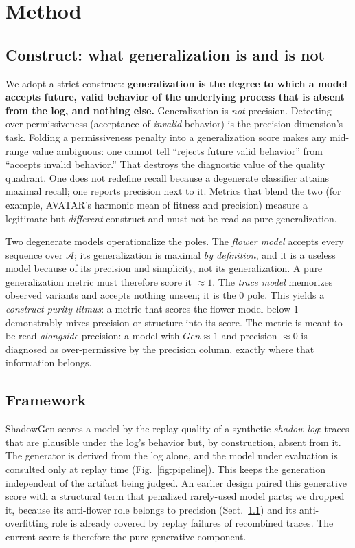 \documentclass[runningheads]{llncs}
\begin{document}
\section{Method}
\label{sec:method}

\subsection{Construct: what generalization is and is not}
\label{sec:method:construct}
We adopt a strict construct: \textbf{generalization is the degree to which a model accepts future, valid behavior of the underlying process that is absent from the log, and nothing else.} Generalization is \emph{not} precision. Detecting over-permissiveness (acceptance of \emph{invalid} behavior) is the precision dimension's task. Folding a permissiveness penalty into a generalization score makes any mid-range value ambiguous: one cannot tell ``rejects future valid behavior'' from ``accepts invalid behavior.'' That destroys the diagnostic value of the quality quadrant. One does not redefine recall because a degenerate classifier attains maximal recall; one reports precision next to it. Metrics that blend the two (for example, AVATAR's harmonic mean of fitness and precision) measure a legitimate but \emph{different} construct and must not be read as pure generalization.

Two degenerate models operationalize the poles. The \emph{flower model} accepts every sequence over $\mathcal{A}$; its generalization is maximal \emph{by definition}, and it is a useless model because of its precision and simplicity, not its generalization. A pure generalization metric must therefore score it $\approx 1$. The \emph{trace model} memorizes observed variants and accepts nothing unseen; it is the $0$ pole. This yields a \emph{construct-purity litmus}: a metric that scores the flower model below $1$ demonstrably mixes precision or structure into its score. The metric is meant to be read \emph{alongside} precision: a model with $\mathit{Gen}\approx 1$ and precision $\approx 0$ is diagnosed as over-permissive by the precision column, exactly where that information belongs.

\subsection{Framework}
\label{sec:method:framework}
ShadowGen scores a model by the replay quality of a synthetic \emph{shadow log}: traces that are plausible under the log's behavior but, by construction, absent from it. The generator is derived from the log alone, and the model under evaluation is consulted only at replay time (Fig.~\ref{fig:pipeline}). This keeps the generation independent of the artifact being judged. An earlier design paired this generative score with a structural term that penalized rarely-used model parts; we dropped it, because its anti-flower role belongs to precision (Sect.~\ref{sec:method:construct}) and its anti-overfitting role is already covered by replay failures of recombined traces. The current score is therefore the pure generative component.
\end{document}
